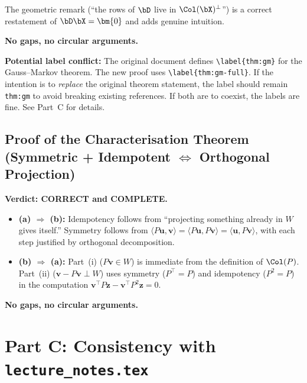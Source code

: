 The geometric remark (``the rows of $\bD$ live in $\Col(\bX)^\perp$'')
is a correct restatement of $\bD\bX = \bm{0}$ and adds genuine intuition.

\textbf{No gaps, no circular arguments.}

\medskip
\noindent\textbf{Potential label conflict:}
The original document defines \verb|\label{thm:gm}| for the Gauss--Markov
theorem. The new proof uses \verb|\label{thm:gm-full}|. If the intention is
to \emph{replace} the original theorem statement, the label should remain
\verb|thm:gm| to avoid breaking existing references. If both are to
coexist, the labels are fine. See Part~C for details.


\subsection*{Proof of the Characterisation Theorem (Symmetric + Idempotent $\Leftrightarrow$ Orthogonal Projection)}

\textbf{Verdict: CORRECT and COMPLETE.}

\begin{itemize}[nosep]
  \item \textbf{(a) $\Rightarrow$ (b):}  Idempotency follows from
        ``projecting something already in $W$ gives itself.''  Symmetry
        follows from $\langle P\bm{u}, \bm{v}\rangle = \langle P\bm{u},
        P\bm{v}\rangle = \langle \bm{u}, P\bm{v}\rangle$, with each step
        justified by orthogonal decomposition. \checkmark
  \item \textbf{(b) $\Rightarrow$ (a):}  Part~(i) ($P\bm{v} \in W$) is
        immediate from the definition of $\Col(P)$.  Part~(ii)
        ($\bm{v} - P\bm{v} \perp W$) uses symmetry ($P^\top = P$) and
        idempotency ($P^2 = P$) in the computation
        $\bm{v}^\top P\bm{z} - \bm{v}^\top P^2\bm{z} = 0$. \checkmark
\end{itemize}

\textbf{No gaps, no circular arguments.}



\section*{Part C: Consistency with \texttt{lecture\_notes.tex}}


